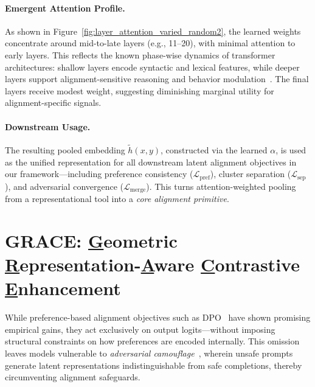 \vspace{1mm}
\paragraph{Emergent Attention Profile.}
As shown in Figure~\ref{fig:layer_attention_varied_random2}, the learned weights concentrate around mid-to-late layers (e.g., 11–20), with minimal attention to early layers. This reflects the known phase-wise dynamics of transformer architectures: shallow layers encode syntactic and lexical features, while deeper layers support alignment-sensitive reasoning and behavior modulation~\cite{belrose2023language, liu2023lost}. The final layers receive modest weight, suggesting diminishing marginal utility for alignment-specific signals.

\vspace{1mm}
\paragraph{Downstream Usage.}
The resulting pooled embedding \(\tilde{h}(x, y)\), constructed via the learned \(\alpha\), is used as the unified representation for all downstream latent alignment objectives in our framework—including preference consistency (\(\mathcal{L}_{\text{pref}}\)), cluster separation (\(\mathcal{L}_{\mathrm{sep}}\)), and adversarial convergence (\(\mathcal{L}_{\mathrm{merge}}\)). This turns attention-weighted pooling from a representational tool into a \emph{core alignment primitive}.







\section{\textsc{GRACE}: \underline{G}eometric \underline{R}epresentation-\underline{A}ware \underline{C}ontrastive \underline{E}nhancement}
\label{sec:appendix_grace}

While preference-based alignment objectives such as DPO~\cite{rafailov2023direct} have shown promising empirical gains, they act exclusively on output logits—without imposing structural constraints on how preferences are encoded internally. This omission leaves models vulnerable to \emph{adversarial camouflage}~\cite{turpin2023llms}, wherein unsafe prompts generate latent representations indistinguishable from safe completions, thereby circumventing alignment safeguards.

